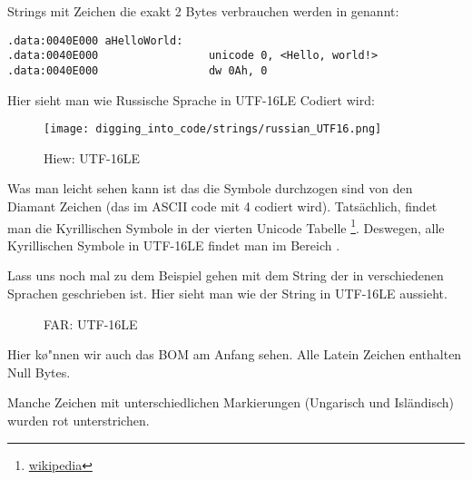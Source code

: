 Strings mit Zeichen die exakt 2 Bytes verbrauchen werden  in \IDA genannt:

\begin{lstlisting}[style=customasmx86]
.data:0040E000 aHelloWorld:
.data:0040E000                 unicode 0, <Hello, world!>
.data:0040E000                 dw 0Ah, 0
\end{lstlisting}

Hier sieht man wie Russische Sprache in UTF-16LE Codiert wird:

\begin{figure}[H]
\centering
\texttt{[image: digging\_into\_code/strings/russian\_UTF16.png]}
\caption{Hiew: UTF-16LE}
\end{figure}

Was man leicht sehen kann ist das die Symbole durchzogen sind von den Diamant Zeichen (das im ASCII code mit 4 codiert wird).
Tats\"achlich, findet man die Kyrillischen Symbole in der vierten Unicode Tabelle 
\footnote{\href{http://go.yurichev.com/17003}{wikipedia}}.
Deswegen, alle Kyrillischen Symbole in UTF-16LE findet man im Bereich .

Lass uns noch mal zu dem Beispiel gehen mit dem String der in verschiedenen Sprachen geschrieben ist.
Hier sieht man wie der String in UTF-16LE aussieht. 

\begin{figure}[H]
\centering
{}
\caption{FAR: UTF-16LE}
\end{figure}

Hier k\o"nnen wir auch das \ac{BOM} am Anfang sehen. 
Alle Latein Zeichen enthalten Null Bytes.

Manche Zeichen mit unterschiedlichen Markierungen (Ungarisch und Isl\"andisch) wurden rot unterstrichen.



